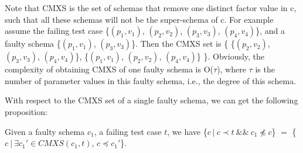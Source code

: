\documentclass{sig-alternate-05-2015}
\begin{document}
Note that CMXS is the set of schemas that remove one distinct factor value in c, such that all these schemas will not be the super-schema of c. For example assume the failing test case \{$(p_{1}, v_{1})$, $(p_{2}, v_{2})$, $(p_{3}, v_{3})$, $(p_{4}, v_{4})$\}, and a faulty schema \{$(p_{1}, v_{1})$, $(p_{3}, v_{3})$\}. Then the CMXS set is \{ \{$(p_{2}, v_{2})$,  $(p_{3}, v_{3})$, $(p_{4}, v_{4})$\}, \{$(p_{1}, v_{1})$,  $(p_{2}, v_{2})$, $(p_{4}, v_{4})$\} \}. Obviously, the complexity of obtaining CMXS of one faulty schema is O($\tau$), where $\tau$ is the number of parameter values in this faulty schema, i.e., the degree of this schema.

With respect to the CMXS set of a single faulty schema, we can get the following proposition:

\begin{proposition}\label{pro:subofCMXS}
Given a faulty schema $c_{1}$, a failing test case $t$, we have \{$c\ |\ c \prec t\ \&\&\ c_{1} \npreceq c$\} $=$  \{$ c\ |\ \exists c_{1}' \in CMXS(c_{1}, t)$, $c \preceq c_{1}'$\}.
\end{proposition}
\end{document}
